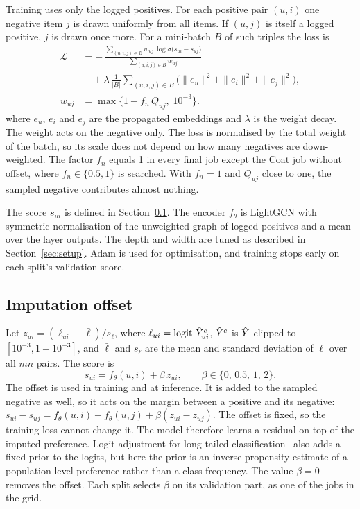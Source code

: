 Training uses only the logged positives. For each positive pair $(u,i)$ one negative item $j$ is
drawn uniformly from all items. If $(u,j)$ is itself a logged positive, $j$ is drawn once more.
For a mini-batch $B$ of such triples the loss is
\begin{equation}\label{eq:loss}
\begin{split}
\mathcal L&=-\,\frac{\sum_{(u,i,j)\in B}w_{uj}\,\log\sigma\bigl(s_{ui}-s_{uj}\bigr)}{\sum_{(u,i,j)\in B}w_{uj}}\\
&\quad+\lambda\,\frac{1}{|B|}\sum_{(u,i,j)\in B}\bigl(\|e_u\|^2+\|e_i\|^2+\|e_j\|^2\bigr),\\
w_{uj}&=\max\bigl\{1-f_n\,Q_{uj},\;10^{-3}\bigr\}.
\end{split}
\end{equation}
where $e_u$, $e_i$ and $e_j$ are the propagated embeddings and $\lambda$ is the weight decay. The
weight acts on the negative only. The loss is normalised by the total weight of the batch, so its
scale does not depend on how many negatives are down-weighted. The factor $f_n$ equals 1 in every
final job except the Coat job without offset, where $f_n\in\{0.5,1\}$ is searched. With $f_n=1$
and $Q_{uj}$ close to one, the sampled negative contributes almost nothing.

The score $s_{ui}$ is defined in Section~\ref{sec:offset}. The encoder $f_\theta$ is LightGCN with
symmetric normalisation of the unweighted graph of logged positives and a mean over the layer
outputs. The depth and width are tuned as described in Section~\ref{sec:setup}. Adam is used for
optimisation, and training stops early on each split's validation score.

\subsection{Imputation offset}\label{sec:offset}

Let $z_{ui}=(\ell_{ui}-\bar\ell)/s_\ell$, where $\ell_{ui}=\operatorname{logit}\,\hat Y^{c}_{ui}$,
$\hat Y^{c}$ is $\hat Y$ clipped to $[10^{-3},1-10^{-3}]$, and $\bar\ell$ and $s_\ell$ are the mean
and standard deviation of $\ell$ over all $mn$ pairs. The score is
\begin{equation}\label{eq:offset}
s_{ui}=f_\theta(u,i)+\beta\,z_{ui},\qquad \beta\in\{0,\,0.5,\,1,\,2\}.
\end{equation}
The offset is used in training and at inference. It is added to the sampled negative as well,
so it acts on the margin between a positive and its negative:
$s_{ui}-s_{uj}=f_\theta(u,i)-f_\theta(u,j)+\beta(z_{ui}-z_{uj})$. The offset is fixed, so the
training loss cannot change it. The model therefore learns a residual on top of the imputed
preference. Logit adjustment for long-tailed classification~\citep{menon2021logit} also adds a
fixed prior to the logits, but here the prior is an inverse-propensity estimate of a
population-level preference rather than a class frequency. The value $\beta=0$ removes the offset.
Each split selects $\beta$ on its validation part, as one of the jobs in the grid.

